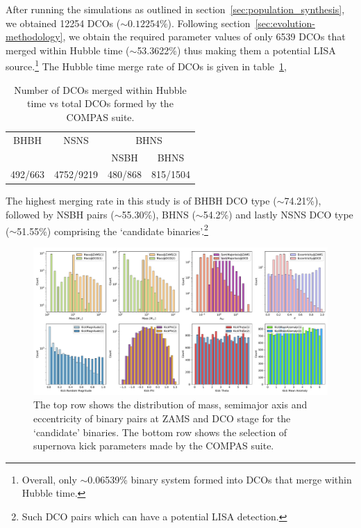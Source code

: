 \documentclass[journal, twocolumn]{IEEEtran}
\begin{document}
    After running the simulations as outlined in section~\ref{sec:population_synthesis}, we obtained 12254 DCOs ($\sim0.12254\%$).
    Following section~\ref{sec:evolution-methodology}, we obtain the required parameter values of only 6539 DCOs that merged within Hubble time ($\sim$53.3622\%) thus making them a potential LISA source.\footnote{Overall, only $\sim$0.06539\% binary system formed into DCOs that merge within Hubble time.}
    The Hubble time merge rate of DCOs is given in table~\ref{tab:dco_details},
    \begin{table}[!ht]%
        \centering
        \begin{tabular}{@{}cccc@{}}
            \toprule
            \multirow{2.5}{*}{BHBH} & \multirow{2.5}{*}{NSNS} & \multicolumn{2}{c}{BHNS} \\ \cmidrule(l){3-4}
            &           & NSBH    & BHNS     \\ \midrule
            492/663 & 4752/9219 & 480/868 & 815/1504 \\ \bottomrule
        \end{tabular}%
        \caption{Number of DCOs merged within Hubble time vs total DCOs formed by the COMPAS suite.}
        \label{tab:dco_details}
    \end{table}

    The highest merging rate in this study is of BHBH DCO type ($\sim$74.21\%), followed by NSBH pairs ($\sim$55.30\%), BHNS ($\sim$54.2\%) and lastly NSNS DCO type ($\sim$51.55\%) comprising the `candidate binaries'.\footnote{Such DCO pairs which can have a potential LISA detection.}

    \begin{figure}[!h]%
        \centering
        \includegraphics[width=\textwidth]{analysis_data/main_analysis_folder/all_zams_params}
        \caption{The top row shows the distribution of mass, semimajor axis and eccentricity of binary pairs at ZAMS and DCO stage for the `candidate' binaries. The bottom row shows the selection of supernova kick parameters made by the COMPAS suite.}
        \label{fig:all_zams_params}
    \end{figure}%
\end{document}
